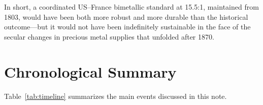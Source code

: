 \documentclass[12pt,letterpaper]{article}
\begin{document}
In short, a coordinated US--France bimetallic standard at 15.5:1, maintained from
1803, would have been both more robust and more durable than the historical
outcome---but it would not have been indefinitely sustainable in the face of the
secular changes in precious metal supplies that unfolded after 1870.

\bigskip

\section{Chronological Summary}

Table~\ref{tab:timeline} summarizes the main events discussed in this note.
\end{document}

